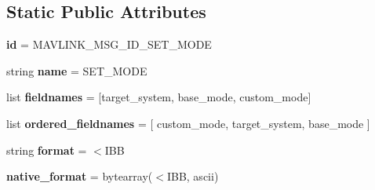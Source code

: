 \subsection*{Static Public Attributes}
\begin{DoxyCompactItemize}
\item 
\mbox{\label{classpymavlink_1_1dialects_1_1v10_1_1MAVLink__set__mode__message_ae5b45dbda5abc46517038615d980dba8}} 
{\bfseries id} = M\+A\+V\+L\+I\+N\+K\+\_\+\+M\+S\+G\+\_\+\+I\+D\+\_\+\+S\+E\+T\+\_\+\+M\+O\+DE
\item 
\mbox{\label{classpymavlink_1_1dialects_1_1v10_1_1MAVLink__set__mode__message_a35800b4c866f28307a2432e998cbf073}} 
string {\bfseries name} = \textquotesingle{}S\+E\+T\+\_\+\+M\+O\+DE\textquotesingle{}
\item 
\mbox{\label{classpymavlink_1_1dialects_1_1v10_1_1MAVLink__set__mode__message_a063027516317c54672643655bea65f81}} 
list {\bfseries fieldnames} = \mbox{[}\textquotesingle{}target\+\_\+system\textquotesingle{}, \textquotesingle{}base\+\_\+mode\textquotesingle{}, \textquotesingle{}custom\+\_\+mode\textquotesingle{}\mbox{]}
\item 
\mbox{\label{classpymavlink_1_1dialects_1_1v10_1_1MAVLink__set__mode__message_ad32902e1b0b9a6a928ad4b8b51ad502c}} 
list {\bfseries ordered\+\_\+fieldnames} = \mbox{[} \textquotesingle{}custom\+\_\+mode\textquotesingle{}, \textquotesingle{}target\+\_\+system\textquotesingle{}, \textquotesingle{}base\+\_\+mode\textquotesingle{} \mbox{]}
\item 
\mbox{\label{classpymavlink_1_1dialects_1_1v10_1_1MAVLink__set__mode__message_a1b7c3cac0c6d736c23b5b7deea7dc266}} 
string {\bfseries format} = \textquotesingle{}$<$I\+BB\textquotesingle{}
\item 
\mbox{\label{classpymavlink_1_1dialects_1_1v10_1_1MAVLink__set__mode__message_abfdb7dac68aefc208bf8b2bc651587a7}} 
{\bfseries native\+\_\+format} = bytearray(\textquotesingle{}$<$I\+BB\textquotesingle{}, \textquotesingle{}ascii\textquotesingle{})

\end{DoxyCompactItemize}
